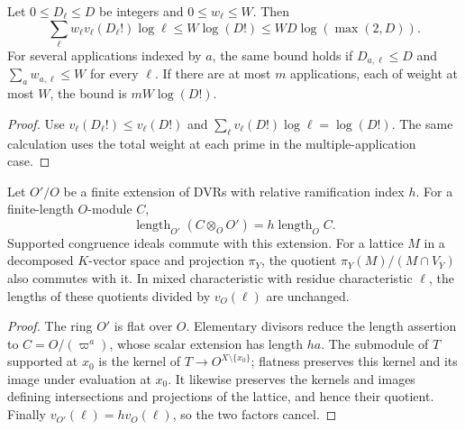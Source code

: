\begin{corollary}
\label{cor:residual-block-factorial-sum}
Let $0\le D_\ell\le D$ be integers and $0\le w_\ell\le W$.
Then
\[
 \sum_\ell w_\ell v_\ell(D_\ell!)\log\ell
       \le W\log(D!)
       \le WD\log(\max(2,D)).
\]
For several applications indexed by $a$, the same bound holds if
$D_{a,\ell}\le D$ and $\sum_a w_{a,\ell}\le W$ for every $\ell$.
If there are at most $m$ applications, each of weight at most $W$,
the bound is $mW\log(D!)$.
\end{corollary}
\begin{proof}
Use $v_\ell(D_\ell!)\le v_\ell(D!)$ and
$\sum_\ell v_\ell(D!)\log\ell=\log(D!)$. The same calculation
uses the total weight at each prime in the multiple-application case.
\end{proof}

\begin{proposition}
\label{prop:residual-block-base-change}
Let $O'/O$ be a finite extension of DVRs with relative ramification
index $h$. For a finite-length $O$-module $C$,
\[
               \operatorname{length}_{O'}(C\otimes_OO')
                   =h\operatorname{length}_O C.
\]
Supported congruence ideals commute with this extension. For a
lattice $M$ in a decomposed $K$-vector space and projection $\pi_Y$,
the quotient $\pi_Y(M)/(M\cap V_Y)$ also commutes with it.
In mixed characteristic with residue characteristic $\ell$, the
lengths of these quotients divided by $v_O(\ell)$ are unchanged.
\end{proposition}
\begin{proof}
The ring $O'$ is flat over $O$. Elementary divisors reduce the
length assertion to $C=O/(\varpi^a)$, whose scalar extension has
length $ha$. The submodule of $T$ supported at $x_0$ is the kernel
of $T\to O^{X\setminus\{x_0\}}$; flatness preserves this kernel
and its image under evaluation at $x_0$. It likewise preserves the
kernels and images defining intersections and projections of the
lattice, and hence their quotient. Finally
$v_{O'}(\ell)=h v_O(\ell)$, so the two factors cancel.
\end{proof}

